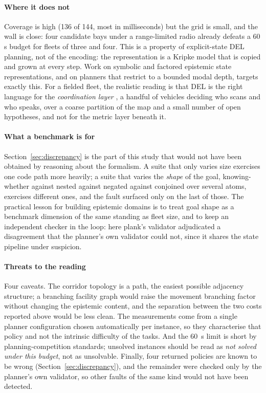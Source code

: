 \documentclass[11pt,a4paper]{article}
\theoremstyle{definition}
\begin{document}
\paragraph{Where it does not}
Coverage is high (136 of 144, most in milliseconds) but the grid is
small, and the wall is close: four candidate bays under a range-limited radio
already defeats a 60\,s budget for fleets of three and four. This is a property
of explicit-state DEL planning, not of the encoding: the representation is a
Kripke model that is copied and grown at every step. Work on symbolic and
factored epistemic state representations, and on planners that restrict to a
bounded modal depth, targets exactly this. For a fielded fleet, the realistic
reading is that DEL is the right language for the \emph{coordination layer} , 
a handful of vehicles deciding who scans and who speaks, over a coarse
partition of the map and a small number of open hypotheses, and not for the
metric layer beneath it.

\paragraph{What a benchmark is for}
Section~\ref{sec:discrepancy} is the part of this study that would not have
been obtained by reasoning about the formalism. A suite that only varies size
exercises one code path more heavily; a suite that varies the \emph{shape} of
the goal, knowing-whether against nested against negated against conjoined
over several atoms, exercises different ones, and the fault surfaced only on
the last of those. The practical lesson for building epistemic domains is to
treat goal shape as a benchmark dimension of the same standing as fleet size,
and to keep an independent checker in the loop: here \textsf{plank}'s validator
adjudicated a disagreement that the planner's own validator could not, since it
shares the state pipeline under suspicion.

\paragraph{Threats to the reading}
Four caveats. The corridor topology is a path, the easiest possible
adjacency structure; a branching facility graph would raise the movement
branching factor without changing the epistemic content, and the separation
between the two costs reported above would be less clean. The measurements come
from a single planner configuration chosen automatically per instance, so they
characterise that policy and not the intrinsic difficulty of the tasks. And
the 60~s limit is short by planning-competition standards; unsolved instances
should be read as \emph{not solved under this budget}, not as unsolvable.
Finally, four returned policies are known to be wrong
(Section~\ref{sec:discrepancy}), and the remainder were checked only by the
planner's own validator, so other faults of the same kind would not have been
detected.
\end{document}
